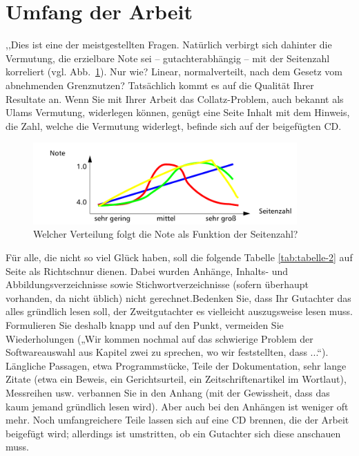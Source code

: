 \section{Umfang der Arbeit}
,,Dies ist eine der meistgestellten Fragen. Natürlich verbirgt sich dahinter die Vermutung, die erzielbare Note sei – gutachterabhängig – mit der Seitenzahl korreliert (vgl. Abb.~\ref{fig:graph}). Nur
wie? Linear, normalverteilt, nach dem Gesetz vom abnehmenden Grenznutzen?
Tatsächlich kommt es auf die Qualität Ihrer Resultate an. Wenn Sie mit Ihrer Arbeit das Collatz-Problem, auch bekannt als Ulams Vermutung, widerlegen können, genügt eine Seite Inhalt mit dem Hinweis, die Zahl, welche die Vermutung widerlegt, befinde sich auf der beigefügten CD.

\begin{figure}[htb]
  \centering
  \includegraphics[width=0.9\textwidth]{figures/note_page.png}
  \caption[Verteilung: Seitenanzahl-Note]{Welcher Verteilung folgt die Note als Funktion der Seitenzahl?}
  \label{fig:graph}
\end{figure}

Für alle, die nicht so viel Glück haben, soll die folgende Tabelle \ref{tab:tabelle-2} auf Seite \pageref{tab:tabelle-2} als Richtschnur
dienen. Dabei wurden Anhänge, Inhalts- und Abbildungsverzeichnisse sowie Stichwortverzeichnisse (sofern überhaupt vorhanden, da nicht üblich) nicht gerechnet.Bedenken Sie, dass Ihr Gutachter das alles gründlich lesen soll, der Zweitgutachter es vielleicht
auszugsweise lesen muss. Formulieren Sie deshalb knapp und auf den Punkt, vermeiden Sie Wiederholungen („Wir kommen nochmal auf das schwierige Problem der Softwareauswahl aus
Kapitel zwei zu sprechen, wo wir feststellten, dass ...“).
Längliche Passagen, etwa Programmstücke, Teile der Dokumentation, sehr lange Zitate (etwa ein Beweis, ein Gerichtsurteil, ein Zeitschriftenartikel im Wortlaut), Messreihen usw.
verbannen Sie in den Anhang (mit der Gewissheit, dass das kaum jemand gründlich lesen wird).
Aber auch bei den Anhängen ist weniger oft mehr. Noch umfangreichere Teile lassen sich auf
eine CD brennen, die der Arbeit beigefügt wird; allerdings ist umstritten, ob ein Gutachter sich
diese anschauen muss.

